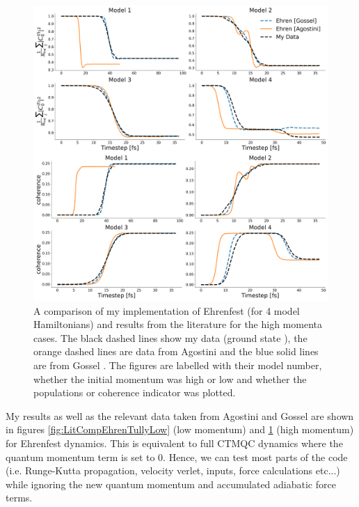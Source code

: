 \begin{figure}[ht]
	\includegraphics[width=\textwidth]{../img/CTMQC/TullyModels/Ehren_highMom.png}
	\caption{\label{fig:LitCompEhrenTullyHigh}A comparison of my implementation of Ehrenfest (for 4 model Hamiltonians) and results from the literature for the high momenta cases. The black dashed lines show my data (ground state ), the orange dashed lines are data from Agostini \cite{agostini_quantum-classical_2016} and the blue solid lines are from Gossel \cite{gossel_coupled-trajectory_2018}. The figures are labelled with their model number, whether the initial momentum was high or low and whether the populations or coherence indicator was plotted.}
\end{figure}
\noindent My results as well as the relevant data taken from Agostini and Gossel \cite{agostini_quantum-classical_2016, gossel_coupled-trajectory_2018} are shown in figures \ref{fig:LitCompEhrenTullyLow} (low momentum) and \ref{fig:LitCompEhrenTullyHigh} (high momentum) for Ehrenfest dynamics. This is equivalent to full CTMQC dynamics where the quantum momentum term is set to 0. Hence, we can test most parts of the code (i.e. Runge-Kutta propagation, velocity verlet, inputs, force calculations etc...) while ignoring the new quantum momentum and accumulated adiabatic force terms.
\\\\
